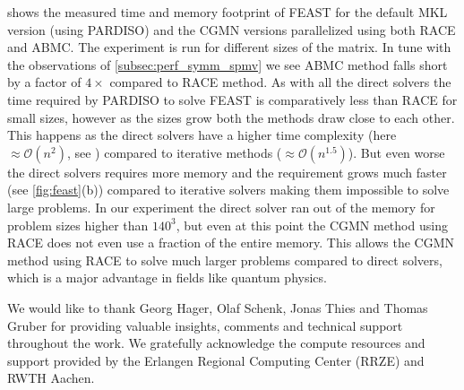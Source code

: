  shows the measured time and memory footprint of FEAST for 
the default MKL version (using PARDISO) and the CGMN versions
 parallelized using both \acrshort{RACE} and \acrshort{ABMC}.
The experiment is run for different sizes of the matrix. In tune
with the observations of \cref{subsec:perf_symm_spmv} we see \acrshort{ABMC}
method falls short by a factor of $4\times$ compared to \acrshort{RACE} method.
As with all the direct solvers the time required by PARDISO to solve FEAST
is comparatively less than \acrshort{RACE} for small sizes, however as the 
sizes grow both the methods draw close to each other. This happens as the 
direct solvers have a higher time complexity (here $\approx \mathcal{O}(n^{2})$, 
see ) compared to iterative methods ($\approx \mathcal{O}(n^{1.5})$).
But even worse the direct solvers requires more memory and the 
requirement grows much faster (see \cref{fig:feast}(b)) compared to 
iterative solvers making them impossible to solve large problems. 
In our experiment the direct solver ran out of the memory for problem sizes
higher than $140^3$, but even at this point the CGMN method using
\acrshort{RACE} does not even use a fraction of the entire memory. 
This allows the CGMN method using \acrshort{RACE} to solve much larger 
problems compared to direct solvers, which is a major advantage 
in fields like quantum physics.




\begin{acks}
We would like to thank Georg Hager, Olaf Schenk, Jonas Thies and Thomas Gruber
 for providing valuable insights, comments and technical support throughout the 
 work.  We gratefully acknowledge the compute resources and support provided by
 the Erlangen Regional Computing Center (RRZE) and RWTH Aachen.
\end{acks}


